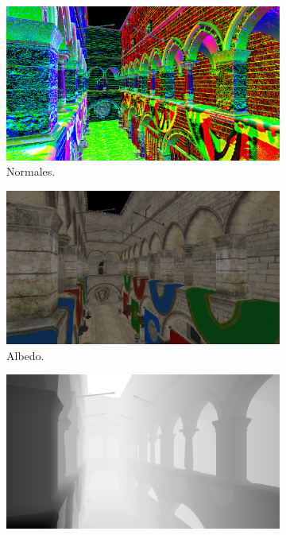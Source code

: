 \begin{figure}[H]
	\centering
	\begin{subfigure}[t]{0.32\textwidth}
		\centering
		\captionsetup{justification=centering}
		\includegraphics[width=\linewidth]{media/engine-Context2-Texture13level0.png}
		\caption*{Normales.}
	\end{subfigure}%
	\hspace{0.01\textwidth}
	\begin{subfigure}[t]{0.32\textwidth}
		\centering
		\captionsetup{justification=centering}
		\includegraphics[width=\linewidth]{media/engine-Context2-Texture14level0.png}
		\caption*{Albedo.}
	\end{subfigure}%
	\hspace{0.01\textwidth}
	\begin{subfigure}[t]{0.32\textwidth}
		\centering
		\captionsetup{justification=centering}
		\includegraphics[width=\linewidth]{media/engine-Context2-Texture17level0.png}

\end{subfigure}
\end{figure}
